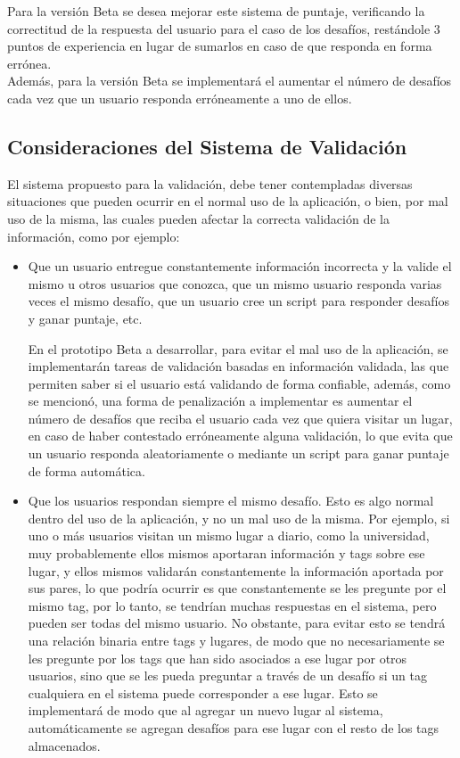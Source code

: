 \documentclass[10pt,letterpaper]{article}
\begin{document}
Para la versión Beta se desea mejorar este sistema de puntaje, verificando la correctitud de la respuesta del usuario para el caso de los desafíos, restándole 3 puntos de experiencia en lugar de sumarlos en caso de que responda en forma errónea.\\

Además, para la versión Beta se implementará el aumentar el número de desafíos cada vez que un usuario responda erróneamente a uno de ellos.\\

\subsection{Consideraciones del Sistema de Validación}

El sistema propuesto para la validación, debe tener contempladas diversas situaciones que pueden ocurrir en el normal uso de la aplicación, o bien, por mal uso de la misma, las cuales pueden afectar la correcta validación de la información, como por ejemplo:\\

\begin{itemize}
\item Que un usuario entregue constantemente información incorrecta y la valide el mismo u otros usuarios que conozca, que un mismo usuario responda varias veces el mismo desafío, que un usuario cree un script para responder desafíos y ganar puntaje, etc.

En el prototipo Beta a desarrollar, para evitar el mal uso de la aplicación, se implementarán tareas de validación basadas en información validada, las que permiten saber si el usuario está validando de forma confiable, además, como se mencionó, una forma de penalización a implementar es aumentar el número de desafíos que reciba el usuario cada vez que quiera visitar un lugar, en caso de haber contestado erróneamente alguna validación, lo que evita que un usuario responda aleatoriamente o mediante un script para ganar puntaje de forma automática.\\

\item Que los usuarios respondan siempre el mismo desafío. Esto es algo normal dentro del uso de la aplicación, y no un mal uso de la misma. Por ejemplo, si uno o más usuarios visitan un mismo lugar a diario, como la universidad, muy probablemente ellos mismos aportaran información y tags sobre ese lugar, y ellos mismos validarán constantemente la información aportada por sus pares, lo que podría ocurrir es que constantemente se les pregunte por el mismo tag, por lo tanto, se tendrían muchas respuestas en el sistema, pero pueden ser todas del mismo usuario. No obstante, para evitar esto se tendrá una relación binaria entre tags y lugares, de modo que no necesariamente se les pregunte por los tags que han sido asociados a ese lugar por otros usuarios, sino que se les pueda preguntar a través de un desafío si un tag cualquiera en el sistema puede corresponder a ese lugar. Esto se implementará de modo que al agregar un nuevo lugar al sistema, automáticamente se agregan desafíos para ese lugar con el resto de los tags almacenados.\\
\end{itemize}
\end{document}
